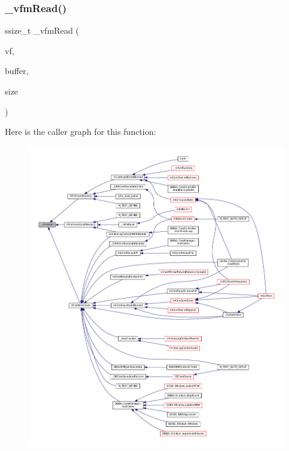 \subsubsection{\texorpdfstring{\+\_\+vfm\+Read()}{\_vfmRead()}}
{\footnotesize\ttfamily ssize\+\_\+t \+\_\+vfm\+Read (\begin{DoxyParamCaption}\item[{struct V\+File $\ast$}]{vf,  }\item[{void $\ast$}]{buffer,  }\item[{size\+\_\+t}]{size }\end{DoxyParamCaption})\hspace{0.3cm}{\ttfamily [static]}}

Here is the caller graph for this function\+:
\nopagebreak
\begin{figure}[H]
\begin{center}
\leavevmode
\includegraphics[width=350pt]{vfs-mem_8c_a2df17620d537539e814f3c9e83d13f2b_icgraph}
\end{center}
\end{figure}
\mbox{\label{vfs-mem_8c_ad6a2ccb75384ff6a3250c97887f3eab8}} 
